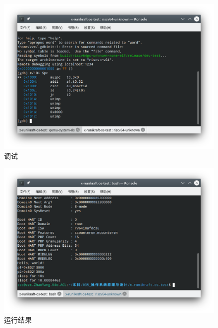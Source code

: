 \documentclass{../runikraft-report}
\begin{document}
\begin{figure}[tbh!]
\centering
\vspace*{-3ex}
\includegraphics[width=0.9\linewidth]{../assets/debug.png}
\vspace*{-3ex}
\caption{调试}
\label{fig:debug}
\end{figure}

\begin{figure}[tbh!]
\centering
\vspace*{-3ex}
\includegraphics[width=0.9\linewidth]{../assets/run.png}
\vspace*{-3ex}
\caption{运行结果}
\label{fig:run}
\end{figure}
\end{document}
